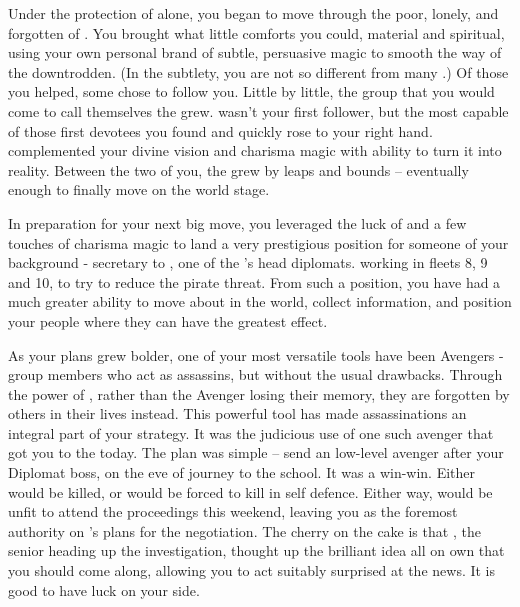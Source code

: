 \documentclass[char]{GL2020}
\begin{document}
Under the protection of \cGenesis{} alone, you began to move through the poor, lonely, and forgotten of \pEarth{}. You brought what little comforts you could, material and spiritual, using your own personal brand of subtle, persuasive magic to smooth the way of the downtrodden. (In the subtlety, you are not so different from many \pShippies{}.) Of those you helped, some chose to follow you. Little by little, the group that you would come to call themselves the \pGoaties{} grew. \cChupSecond{} wasn’t your first follower, but \cChupSecond{\they} \cChupSecond{\were} the most capable of those first devotees you found and quickly rose to your right hand. \cChupSecond{} complemented your divine vision and charisma magic with \cChupSecond{\their} ability to turn it into reality. Between the two of you, the \pGoaties{} grew by leaps and bounds -- eventually enough to finally move on the world stage.

In preparation for your next big move, you leveraged the luck of \cGenesis{} and a few touches of charisma magic to land a very prestigious position for someone of your background - secretary to \cHeadDiplomat{}, one of the \pShip{}’s head diplomats. \cHeadDiplomat{\they} \cHeadDiplomat{\were} working in fleets 8, 9 and 10, to try to reduce the pirate threat. From such a position, you have had a much greater ability to move about in the world, collect information, and position your people where they can have the greatest effect. 

As your plans grew bolder, one of your most versatile tools have been Avengers - group members who act as assassins, but without the usual drawbacks. Through the power of \cGenesis{}, rather than the Avenger losing their memory, they are forgotten by others in their lives instead. This powerful tool has made assassinations an integral part of your strategy. It was the judicious use of one such avenger that got you to the \pSc{} today. The plan was simple -- send an low-level avenger after your Diplomat boss, \cHeadDiplomat{} on the eve of \cHeadDiplomat{\their} journey to the school. It was a win-win. Either \cHeadDiplomat{} would be killed, or \cHeadDiplomat{\they} would be forced to kill in self defence. Either way, \cHeadDiplomat{\they} would be unfit to attend the proceedings this weekend, leaving you as the foremost authority on \cHeadDiplomat{}’s plans for the negotiation. The cherry on the cake is that \cEbbPriest{}, the senior \cEbbPriest{\cleric} heading up the investigation, thought up the brilliant idea all on \cEbbPriest{\their} own that you should come along, allowing you to act suitably surprised at the news. It is good to have luck on your side.
\end{document}
